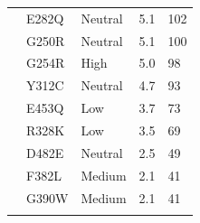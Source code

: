 \documentclass[phd,tocprelim]{cornell}
\begin{document}
\begin{landscape}
\begin{ThreePartTable}
\begin{longtable}[c]{lllll}
			& E282Q & Neutral & 5.1 & 102 \\
			& G250R & Neutral & 5.1 & 100 \\
			& G254R & High & 5.0 & 98 \\
			& Y312C & Neutral & 4.7 & 93 \\
			& E453Q & Low & 3.7 & 73 \\
			& R328K & Low & 3.5 & 69 \\
			& D482E & Neutral & 2.5 & 49 \\
			& F382L & Medium & 2.1 & 41 \\
			& G390W & Medium & 2.1 & 41 \\
			\bottomrule
			\insertTableNotes  %
\end{longtable}
\end{ThreePartTable}
\end{landscape}
\end{document}
